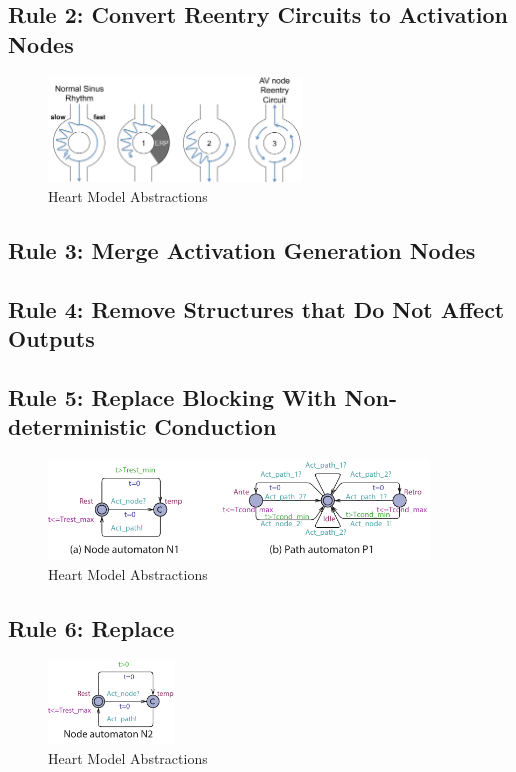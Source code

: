 \subsection{Rule 2: Convert Reentry Circuits to Activation Nodes}
\begin{figure}[!h]
		\centering
		\includegraphics[width=0.6\textwidth]{figs/reentry.pdf}
		\caption{\small Heart Model Abstractions}
		\label{fig:reentry}
\end{figure}
\subsection{Rule 3: Merge Activation Generation Nodes}
\subsection{Rule 4: Remove Structures that Do Not Affect Outputs}
\subsection{Rule 5: Replace Blocking With Non-deterministic Conduction}

\begin{figure}[!h]
		\centering
		\includegraphics[width=0.9\textwidth]{figs/rule5.pdf}
		\caption{\small Heart Model Abstractions}
		\label{fig:rule5}
\end{figure}
\subsection{Rule 6: Replace}

\begin{figure}[!h]
		\centering
		\includegraphics[width=0.3\textwidth]{figs/rule6.pdf}
		\caption{\small Heart Model Abstractions}
		\label{fig:rule6}
\end{figure}
